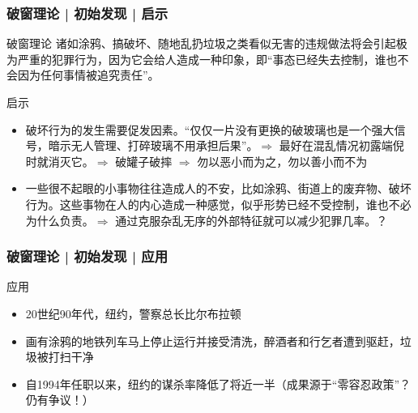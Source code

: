 \begin{frame}
  \frametitle{破窗理论 | 初始发现 | \alert{启示}}
  \begin{block}{破窗理论}
诸如涂鸦、搞破坏、随地乱扔垃圾之类看似无害的违规做法将会引起极为严重的犯罪行为，因为它会给人造成一种印象，即“事态已经失去控制，谁也不会因为任何事情被追究责任”。
  \end{block}
  \pause
  \begin{block}{启示}
    \begin{itemize}
    \item 破坏行为的发生需要促发因素。“仅仅一片没有更换的破玻璃也是一个强大信号，暗示无人管理、打碎玻璃不用承担后果”。$\Longrightarrow$ 最好在混乱情况初露端倪时就消灭它。$\Longrightarrow$ 破罐子破摔 $\Longrightarrow$ 勿以恶小而为之，勿以善小而不为
      \item 一些很不起眼的小事物往往造成人的不安，比如涂鸦、街道上的废弃物、破坏行为。这些事物在人的内心造成一种感觉，似乎形势已经不受控制，谁也不必为什么负责。$\Longrightarrow$ 通过克服杂乱无序的外部特征就可以减少犯罪几率。？
    \end{itemize}
  \end{block}
\end{frame}

\begin{frame}
  \frametitle{破窗理论 | 初始发现 | 应用}
  \begin{block}{应用}
    \begin{itemize}
      \item 20世纪90年代，纽约，警察总长比尔\textbullet 布拉顿
      \item 画有涂鸦的地铁列车马上停止运行并接受清洗，醉酒者和行乞者遭到驱赶，垃圾被打扫干净
      \item 自1994年任职以来，纽约的谋杀率降低了将近一半（成果源于“零容忍政策”？仍有争议！）
    \end{itemize}
  \end{block}
\end{frame}

